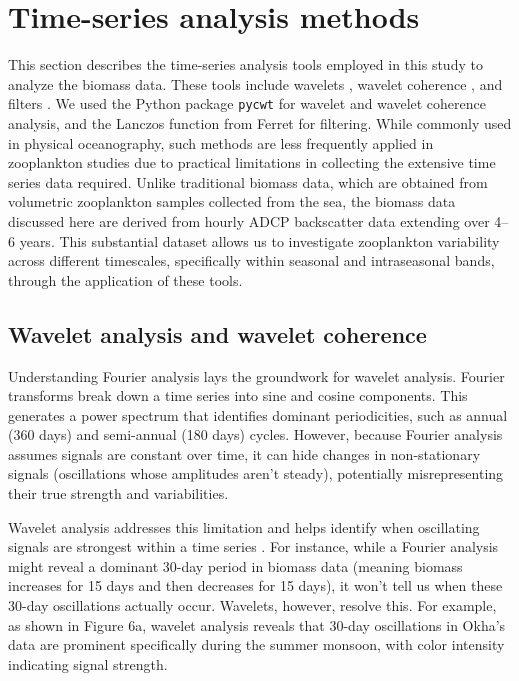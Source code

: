 \documentclass[12pt,a4paper]{article}
\begin{document}
\section{Time-series analysis methods}
\label{sec:wavelet_lanczos}

This section describes the time-series analysis tools employed in this study to analyze the biomass data. These tools include wavelets \citep{torrence1998practical}, wavelet coherence \citep{maraun2004cross}, and filters \citep{duchon1979lanczos}.
We used the Python package \texttt{pycwt} for wavelet and wavelet coherence analysis, and the Lanczos function from Ferret for filtering. While commonly used in physical oceanography, such methods are less frequently applied in zooplankton studies due to practical limitations in collecting the extensive time series data required. Unlike traditional biomass data, which are obtained from volumetric zooplankton samples collected from the sea, the biomass data discussed here are derived from hourly ADCP backscatter data extending over 4–6 years. This substantial dataset allows us to investigate zooplankton variability across different timescales, specifically within seasonal and intraseasonal bands, through the application of these tools.




\subsection{Wavelet analysis and wavelet coherence}
\label{sec:wavelet_analysis}

Understanding Fourier analysis lays the groundwork for wavelet analysis. Fourier transforms break down a time series into sine and cosine components. This generates a power spectrum that identifies dominant periodicities, such as annual (360 days) and semi-annual (180 days) cycles.  However, because Fourier analysis assumes signals are constant over time, it can hide changes in non-stationary signals (oscillations whose amplitudes aren't steady), potentially misrepresenting their true strength and variabilities.

Wavelet analysis addresses this limitation and helps identify when oscillating signals are strongest within a time series \citep{torrence1998practical}. For instance, while a Fourier analysis might reveal a dominant 30-day period in biomass data (meaning biomass increases for 15 days and then decreases for 15 days), it won't tell us when these 30-day oscillations actually occur.  Wavelets, however, resolve this. For example, as shown in Figure 6a, wavelet analysis reveals that 30-day oscillations in Okha's data are prominent specifically during the summer monsoon, with color intensity indicating signal strength.
\end{document}

